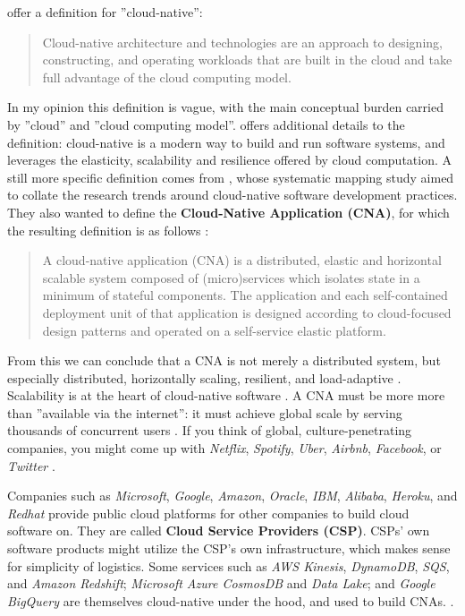 \documentclass[utf8,english]{gradu3}
\begin{document}
\textcite{Microsoft2022-CNA} offer a definition for ''cloud-native'':

\begin{quote} Cloud-native architecture and technologies are an approach to
  designing, constructing, and operating workloads that are built in the cloud and
  take full advantage of the cloud computing model.
\end{quote}

In my opinion this definition is vague, with the main conceptual burden carried
by ''cloud'' and ''cloud computing model''. \textcite{Patrizio2018} offers
additional details to the definition: cloud-native is a modern way to build and
run software systems, and leverages the elasticity, scalability and resilience
offered by cloud computation. A still more specific
definition comes from \textcite{Kratzke2017}, whose systematic mapping study
aimed to collate the research trends around cloud-native software development
practices. They also wanted to define the \textbf{Cloud-Native Application
  (CNA)}, for which the resulting definition is as follows \parencite[13]{Kratzke2017}:

\begin{quote}
  A cloud-native application (CNA) is a distributed, elastic and horizontal
  scalable system composed of (micro)services which isolates state in a minimum
  of stateful components. The application and each self-contained deployment
  unit of that application is designed according to cloud-focused design
  patterns and operated on a self-service elastic platform.
\end{quote}

From this we can conclude that a CNA is not merely a distributed system, but
especially distributed, horizontally scaling, resilient, and load-adaptive
\parencite[13]{Kratzke2017}. Scalability is at the heart of cloud-native
software \parencite{CNAF2018}. A CNA must be more more than ''available via the
internet'': it must achieve global scale by serving thousands of concurrent
users \parencite[17]{Gannon2017}. If you think of global, culture-penetrating
companies, you might come up with \textit{Netflix}, \textit{Spotify},
\textit{Uber}, \textit{Airbnb}, \textit{Facebook}, or \textit{Twitter}
\parencites{Gannon2017}{Patrizio2018}.

Companies such as \textit{Microsoft}, \textit{Google}, \textit{Amazon},
\textit{Oracle}, \textit{IBM}, \textit{Alibaba}, \textit{Heroku}, and
\textit{Redhat} provide public cloud platforms for other companies to build
cloud software on. They are called \textbf{Cloud Service Providers (CSP)}. CSPs'
own software products might utilize the CSP's own infrastructure, which makes
sense for simplicity of logistics. Some services such as \textit{AWS Kinesis},
\textit{DynamoDB}, \textit{SQS}, and \textit{Amazon Redshift}; \textit{Microsoft
  Azure CosmosDB} and \textit{Data Lake}; and \textit{Google BigQuery} are
themselves cloud-native under the hood, and used to build CNAs.
\parencite[17]{Gannon2017}.
\end{document}
